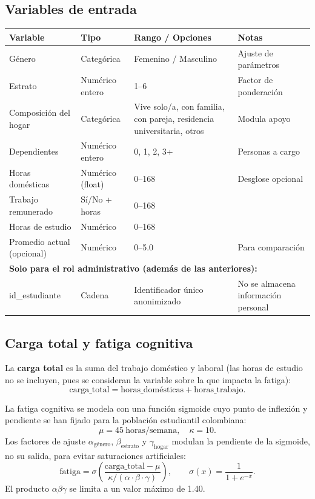 \documentclass[12pt, spanish]{article}
\begin{document}
\subsection{Variables de entrada}
\begin{table}[H]
\centering
\small
\setlength{\tabcolsep}{4pt}
\begin{tabular}{p{}p{}p{}p{}}
\toprule
\textbf{Variable} & \textbf{Tipo} & \textbf{Rango / Opciones} & \textbf{Notas} \\
\midrule
Género & Categórica & Femenino / Masculino & Ajuste de parámetros \\
Estrato & Numérico entero & 1–6 & Factor de ponderación \\
Composición del hogar & Categórica & Vive solo/a, con familia, con pareja, residencia universitaria, otros & Modula apoyo \\
Dependientes & Numérico entero & 0, 1, 2, 3+ & Personas a cargo \\
Horas domésticas & Numérico (float) & 0–168 & Desglose opcional \\
Trabajo remunerado & Sí/No + horas & 0–168 & \\
Horas de estudio & Numérico & 0–168 & \\
Promedio actual (opcional) & Numérico & 0–5.0 & Para comparación \\
\midrule
\multicolumn{4}{l}{\textbf{Solo para el rol administrativo (además de las anteriores):}} \\
id\_estudiante & Cadena & Identificador único anonimizado & No se almacena información personal \\
\bottomrule
\end{tabular}
\end{table}

\subsection{Carga total y fatiga cognitiva}

La \textbf{carga total} es la suma del trabajo doméstico y laboral (las horas de estudio no se incluyen, pues se consideran la variable sobre la que impacta la fatiga):
\[
\text{carga\_total} = \text{horas\_domésticas} + \text{horas\_trabajo}.
\]

La fatiga cognitiva se modela con una función sigmoide cuyo punto de inflexión y pendiente se han fijado para la población estudiantil colombiana:
\[
\mu = 45\ \text{horas/semana},\quad \kappa = 10.
\]
Los factores de ajuste \(\alpha_{\text{género}}\), \(\beta_{\text{estrato}}\) y \(\gamma_{\text{hogar}}\) modulan la pendiente de la sigmoide, no su salida, para evitar saturaciones artificiales:
\[
\text{fatiga} = \sigma\!\left( \frac{\text{carga\_total} - \mu}{\kappa / (\alpha \cdot \beta \cdot \gamma)} \right),
\qquad \sigma(x)=\frac{1}{1+e^{-x}}.
\]
El producto \(\alpha\beta\gamma\) se limita a un valor máximo de 1.40.
\end{document}
